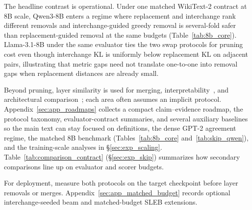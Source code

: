 \documentclass{article}
\begin{document}
The headline contrast is operational. Under one matched WikiText-2 contract at 8B scale, Qwen3-8B enters a regime where replacement and interchange rank different removals and interchange-guided greedy removal is several-fold safer than replacement-guided removal at the same budgets (Table~\ref{tab:8b_core}). Llama-3.1-8B under the same evaluator ties the two swap protocols for pruning cost even though interchange KL is uniformly below replacement KL on adjacent pairs, illustrating that metric gaps need not translate one-to-one into removal gaps when replacement distances are already small.

Beyond pruning, layer similarity is used for merging, interpretability~\citep{elhage2021mathematical}, and architectural comparison~\citep{raghu2021vision}; each area often assumes an implicit protocol. Appendix~\ref{sec:app_roadmaps} collects a compact claim--evidence roadmap, the protocol taxonomy, evaluator-contract summaries, and several auxiliary baselines so the main text can stay focused on definitions, the dense GPT-2 agreement regime, the matched 8B benchmark (Tables~\ref{tab:8b_core} and~\ref{tab:skip_qwen}), and the training-scale analyses in \S\ref{sec:exp_scaling}. Table~\ref{tab:comparison_contract} (\S\ref{sec:exp_skip}) summarizes how secondary comparisons line up on evaluator and scorer budgets.

For deployment, measure both protocols on the target checkpoint before layer removals or merges. Appendix~\ref{sec:app_matched_budget} records optional interchange-seeded beam and matched-budget SLEB extensions.
\end{document}
